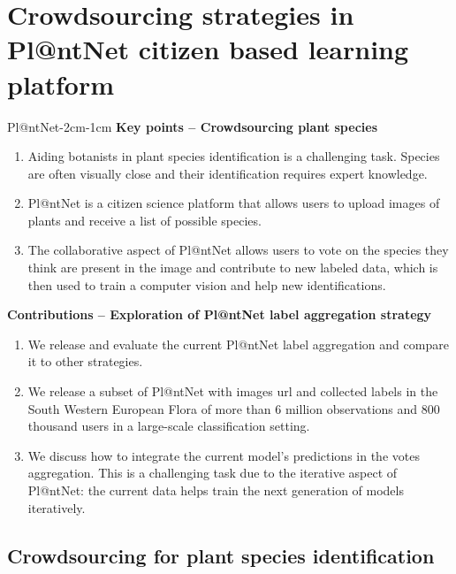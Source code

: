 \chapter{Crowdsourcing strategies in Pl@ntNet citizen based learning platform}
\label{chap:plantnet}
\enlargethispage{3\baselineskip}

\begin{keypointstwomargins}{Pl@ntNet}{-2cm}{-1cm}
        \textbf{Key points -- Crowdsourcing plant species}
        \begin{enumerate}[leftmargin=*]
        \item Aiding botanists in plant species identification is a challenging task. Species are often visually close and their identification requires expert knowledge.
        \item Pl@ntNet is a citizen science platform that allows users to upload images of plants and receive a list of possible species.
        \item The collaborative aspect of Pl@ntNet allows users to vote on the species they think are present in the image and contribute to new labeled data, which is then used to train a computer vision and help new identifications.
        \end{enumerate}

        \textbf{Contributions -- Exploration of Pl@ntNet label aggregation strategy}
        \begin{enumerate}[leftmargin=*,start=4]
        \item We release and evaluate the current Pl@ntNet label aggregation and compare it to other strategies.
        \item We release a subset of Pl@ntNet with images url and collected labels in the South Western European Flora of more than $6$ million observations and $800$ thousand users in a large-scale classification setting.
        \item We discuss how to integrate the current model's predictions in the votes aggregation. This is a challenging task due to the iterative aspect of Pl@ntNet: the current data helps train the next generation of models iteratively.
        \end{enumerate}
\end{keypointstwomargins}


\section{Crowdsourcing for plant species identification}

